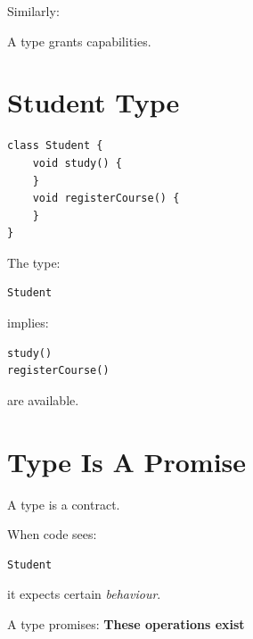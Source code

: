 \documentclass[11pt,a4paper]{book}
\begin{document}

Similarly:

A type grants capabilities.


\section{Student Type}

\begin{verbatim}
class Student {
    void study() {
    }
    void registerCourse() {
    }
}
\end{verbatim}


The type:

\begin{verbatim}
Student
\end{verbatim}

implies:

\begin{verbatim}
study()
registerCourse()
\end{verbatim}

are available.


\section{Type Is A Promise}

\begin{idea}

A type is a contract.

\end{idea}


When code sees:

\begin{verbatim}
Student
\end{verbatim}

it expects certain \emph{behaviour}.


A type promises: \textcolor{RosettaPurple}{\textbf{These operations exist}}


\end{document}
